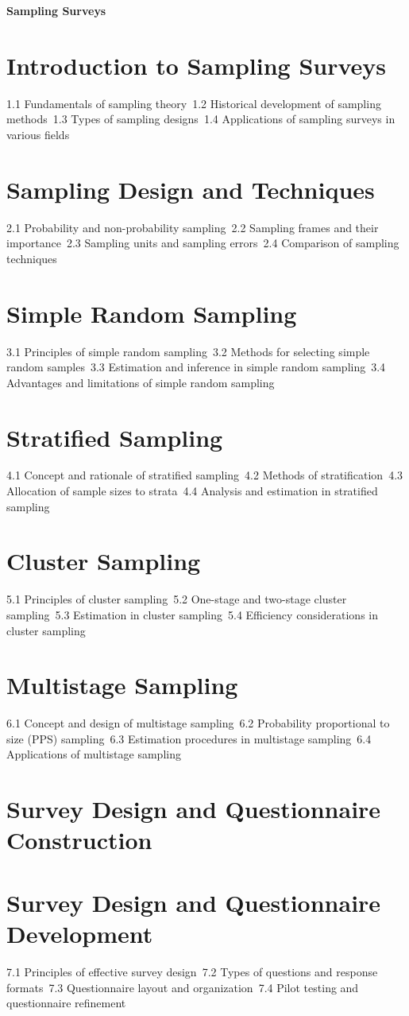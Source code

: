 {\LARGE \bf{Sampling Surveys}}
\section{Introduction to Sampling Surveys}
1.1 Fundamentals of sampling theory\
1.2 Historical development of sampling methods\
1.3 Types of sampling designs\
1.4 Applications of sampling surveys in various fields\
\section{Sampling Design and Techniques}
2.1 Probability and non-probability sampling\
2.2 Sampling frames and their importance\
2.3 Sampling units and sampling errors\
2.4 Comparison of sampling techniques\
\section{Simple Random Sampling}
3.1 Principles of simple random sampling\
3.2 Methods for selecting simple random samples\
3.3 Estimation and inference in simple random sampling\
3.4 Advantages and limitations of simple random sampling\
\section{Stratified Sampling}
4.1 Concept and rationale of stratified sampling\
4.2 Methods of stratification\
4.3 Allocation of sample sizes to strata\
4.4 Analysis and estimation in stratified sampling\
\section{Cluster Sampling}
5.1 Principles of cluster sampling\
5.2 One-stage and two-stage cluster sampling\
5.3 Estimation in cluster sampling\
5.4 Efficiency considerations in cluster sampling\
\section{Multistage Sampling}
6.1 Concept and design of multistage sampling\
6.2 Probability proportional to size (PPS) sampling\
6.3 Estimation procedures in multistage sampling\
6.4 Applications of multistage sampling\
\section{Survey Design and Questionnaire Construction}
\section{Survey Design and Questionnaire Development}
7.1 Principles of effective survey design\
7.2 Types of questions and response formats\
7.3 Questionnaire layout and organization\
7.4 Pilot testing and questionnaire refinement\
